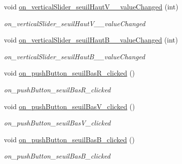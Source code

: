 \begin{DoxyCompactItemize}
\mbox{\label{classMainWindow_a7800e4bb1bbfe1e956e4379ce7127677}} 
void \hyperlink{classMainWindow_a7800e4bb1bbfe1e956e4379ce7127677}{on\+\_\+vertical\+Slider\+\_\+seuil\+Haut\+V\+\_\+\_\+value\+Changed} (int)
\begin{DoxyCompactList}\small\item\em on\+\_\+vertical\+Slider\+\_\+seuil\+Haut\+V\+\_\+\_\+value\+Changed \end{DoxyCompactList}\item 
\mbox{\label{classMainWindow_a697625302189c63431547221bc6cbab2}} 
void \hyperlink{classMainWindow_a697625302189c63431547221bc6cbab2}{on\+\_\+vertical\+Slider\+\_\+seuil\+Haut\+B\+\_\+\_\+value\+Changed} (int)
\begin{DoxyCompactList}\small\item\em on\+\_\+vertical\+Slider\+\_\+seuil\+Haut\+B\+\_\+\_\+value\+Changed \end{DoxyCompactList}\item 
\mbox{\label{classMainWindow_a5818966b3d0af54935e5bd1675c94665}} 
void \hyperlink{classMainWindow_a5818966b3d0af54935e5bd1675c94665}{on\+\_\+push\+Button\+\_\+seuil\+Bas\+R\+\_\+clicked} ()
\begin{DoxyCompactList}\small\item\em on\+\_\+push\+Button\+\_\+seuil\+Bas\+R\+\_\+clicked \end{DoxyCompactList}\item 
\mbox{\label{classMainWindow_ad0e42a59ec6774929767d0897ce195ba}} 
void \hyperlink{classMainWindow_ad0e42a59ec6774929767d0897ce195ba}{on\+\_\+push\+Button\+\_\+seuil\+Bas\+V\+\_\+clicked} ()
\begin{DoxyCompactList}\small\item\em on\+\_\+push\+Button\+\_\+seuil\+Bas\+V\+\_\+clicked \end{DoxyCompactList}\item 
\mbox{\label{classMainWindow_addb0990dd617b755d2e14481b032fe1c}} 
void \hyperlink{classMainWindow_addb0990dd617b755d2e14481b032fe1c}{on\+\_\+push\+Button\+\_\+seuil\+Bas\+B\+\_\+clicked} ()
\begin{DoxyCompactList}\small\item\em on\+\_\+push\+Button\+\_\+seuil\+Bas\+B\+\_\+clicked \end{DoxyCompactList}\item 

\end{DoxyCompactItemize}
